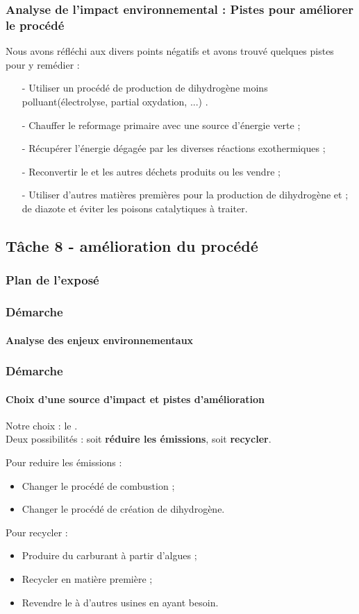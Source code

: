 \documentclass{beamer}
\begin{document}
	\begin{frame}
	\frametitle{Analyse de l'impact environnemental : Pistes pour améliorer le procédé}
	Nous avons réfléchi aux divers points négatifs et avons trouvé quelques pistes pour y remédier :
	\begin{itemize}
		\item[-] Utiliser un procédé de production de dihydrogène moins polluant(électrolyse, partial oxydation, ...) .
		\item[-] Chauffer le reformage primaire avec une source d'énergie verte ;
		\item[-] Récupérer l'énergie dégagée par les diverses réactions exothermiques ;
		\item[-] Reconvertir le  et les autres déchets produits ou les vendre ;
		\item[-] Utiliser d'autres matières premières pour la production de dihydrogène et ;
		de diazote et éviter les poisons catalytiques à traiter.
	\end{itemize}
	\end{frame}
	
	\begin{frame}
		\section{Tâche 8 - amélioration du procédé}
		\frametitle{Plan de l'exposé}
		\tableofcontents[currentsubsection,sectionstyle=show/shaded,subsectionstyle=show/shaded/hide]
	\end{frame}
	
	\begin{frame}
		\frametitle{Démarche}
		\framesubtitle{Analyse des enjeux environnementaux}
		
	\end{frame}
	
	\begin{frame}
		\frametitle{Démarche}
		\framesubtitle{Choix d'une source d'impact et pistes d'amélioration} %
		Notre choix : le \chemform{CO_2}.\\
		Deux possibilités : soit \textbf{réduire les émissions}, soit \textbf{recycler}.
		
		Pour reduire les émissions :
		\begin{itemize}
			\item Changer le procédé de combustion ;
			\item Changer le procédé de création de dihydrogène.
		\end{itemize}
		Pour recycler :
		\begin{itemize}
			\item Produire du carburant à partir d'algues ;
			\item Recycler en matière première ;
			\item Revendre le  à d'autres usines
			en ayant besoin.
		\end{itemize}
	\end{frame}
	
\end{document}
